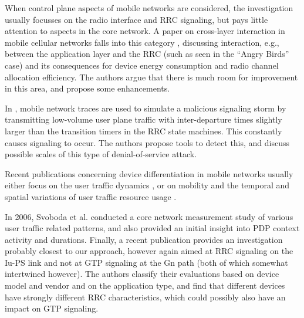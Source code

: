 When control plane aspects of mobile networks are considered, the investigation usually focusses on the radio interface and \ac{RRC} signaling, but pays little attention to aspects in the core network. A paper on cross-layer interaction in mobile cellular networks falls into this category \cite{qian2011profiling}, discussing interaction, e.g., between the application layer and the \ac{RRC} (such as seen in the ``Angry Birds'' case) and its consequences for device energy consumption and radio channel allocation efficiency. The authors argue that there is much room for improvement in this area, and propose some enhancements.

In \cite{lee2007detection}, mobile network traces are used to simulate a malicious signaling storm by transmitting low-volume user plane traffic with inter-departure times slightly larger than the transition timers in the \ac{RRC} state machines. This constantly causes signaling to occur. The authors propose tools to detect this, and discuss possible scales of this type of denial-of-service attack.

Recent publications concerning device differentiation in mobile networks usually either focus on the user traffic dynamics \cite{shafiq2011characterizing}, or on mobility and the temporal and spatial variations of user traffic resource usage  \cite{paul2011understanding}.

In 2006, Svoboda et al. \cite{svoboda2006composition} conducted a core network measurement study of various user traffic related patterns, and also provided an initial insight into \ac{PDP} context activity and durations. Finally, a recent publication \cite{he2012panoramic} provides an investigation probably closest to our approach, however again aimed at \ac{RRC} signaling on the Iu-PS link and not at \ac{GTP} signaling at the Gn path (both of which somewhat intertwined however). The authors classify their evaluations based on device model and vendor and on the application type, and find that different devices have strongly different \ac{RRC} characteristics, which could possibly also have an impact on \ac{GTP} signaling.




